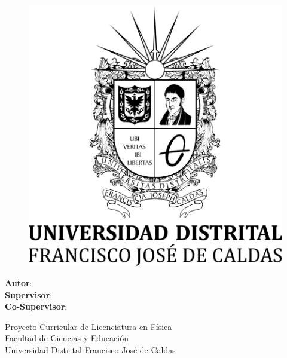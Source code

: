 \makeatletter
\begin{titlepage}
    \begin{center}
        \vspace*{1cm}

        \Large
        \textbf{\@title}

        \vspace{1.5cm}
        
        \thesistype{}
        
        \vspace{1cm}

        \begin{figure}[htbp]
             \centering
             \includegraphics[width=.5\linewidth]{./Figures/UoC_Logo.png}
        \end{figure}

        \vspace{1cm}

        \large
        \textbf{Autor}: \thesisauthor{}\\
        \large
        \textbf{Supervisor}: \supervisor{}\\
        \large
        \textbf{Co-Supervisor}: \cosupervisor{}

        \vspace{1cm}
        \large
        Proyecto Curricular de Licenciatura en Física\\
        Facultad de Ciencias y Educación\\
        Universidad Distrital Francisco José de Caldas\\

        \vspace{1cm}
        \@date

    \end{center}
\end{titlepage}
\makeatother